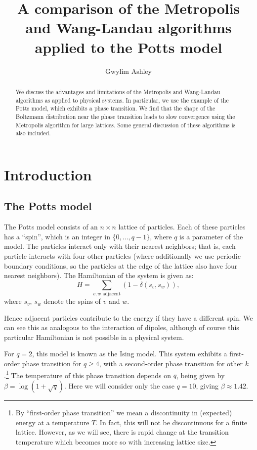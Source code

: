 \documentclass{article}
\author{Gwylim Ashley}
\title{A comparison of the Metropolis and Wang-Landau algorithms applied to the Potts model}
\begin{document}
\maketitle
\begin{abstract}
We discuss the advantages and limitations of the Metropolis and Wang-Landau algorithms as applied to physical systems.
In particular, we use the example of the Potts model, which exhibits a phase transition.
We find that the shape of the Boltzmann distribution near the phase transition leads to slow convergence using the Metropolis algorithm for large lattices.
Some general discussion of these algorithms is also included.
\end{abstract}
\section{Introduction}
\subsection{The Potts model}
The Potts model consists of an $n\times n$ lattice of particles.
Each of these particles has a ``spin'', which is an integer in $\{0,...,q-1\}$, where $q$ is a parameter of the model.
The particles interact only with their nearest neighbors; that is, each particle interacts with four other particles (where additionally we use periodic boundary conditions, so the particles at the edge of the lattice also have four nearest neighbors).
The Hamiltonian of the system is given as:
$$ H = \sum_{v, w \text{ adjacent}}(1-\delta(s_v, s_w)), $$
where $s_v$, $s_w$ denote the spins of $v$ and $w$.

Hence adjacent particles contribute to the energy if they have a different spin.
We can see this as analogous to the interaction of dipoles, although of course this particular Hamiltonian is not possible in a physical system.

For $q = 2$, this model is known as the Ising model.
This system exhibits a first-order phase transition for $q \geq 4$, with a second-order phase transition for other $k$.\cite{Janke}\footnote{By ``first-order phase transition'' we mean a discontinuity in (expected) energy at a temperature $T$. In fact, this will not be discontinuous for a finite lattice. However, as we will see, there is rapid change at the transition temperature which becomes more so with increasing lattice size.}
The temperature of this phase transition depends on $q$, being given by $\beta = \log(1+\sqrt q)$.\cite{Janke}
Here we will consider only the case $q = 10$, giving $\beta \approx 1.42$.
\end{document}
